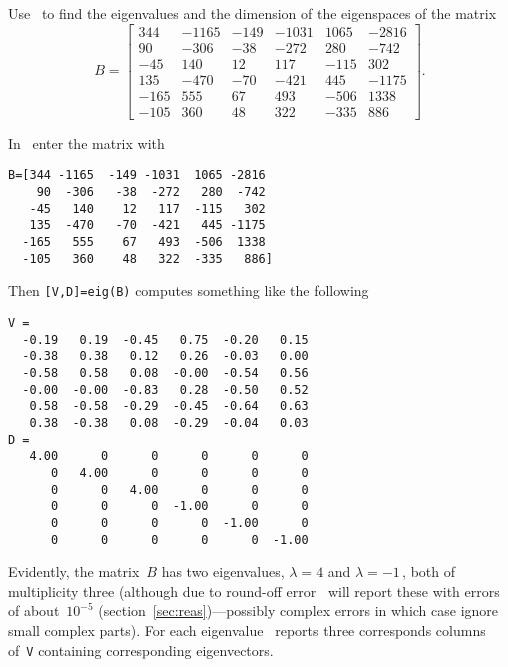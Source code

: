 \begin{example} \label{eg:}
Use \script\ to find the eigenvalues and the dimension of the eigenspaces of the matrix 
\begin{equation*}
B=\begin{bmatrix} 344&-1165&-149&-1031&1065&-2816
\\90&-306&-38&-272&280&-742
\\-45&140&12&117&-115&302
\\135&-470&-70&-421&445&-1175
\\-165&555&67&493&-506&1338
\\-105&360&48&322&-335&886 \end{bmatrix}.
\end{equation*}

\begin{solution} 
In \script\ enter the matrix with
\begin{verbatim}
B=[344 -1165  -149 -1031  1065 -2816
    90  -306   -38  -272   280  -742
   -45   140    12   117  -115   302
   135  -470   -70  -421   445 -1175
  -165   555    67   493  -506  1338
  -105   360    48   322  -335   886]
\end{verbatim}
\setbox\ajrqrbox\hbox{}%
\marginpar{\usebox{\ajrqrbox}}%
Then \verb|[V,D]=eig(B)| computes something like the following \twodp
\begin{verbatim}
V =
  -0.19   0.19  -0.45   0.75  -0.20   0.15
  -0.38   0.38   0.12   0.26  -0.03   0.00
  -0.58   0.58   0.08  -0.00  -0.54   0.56
  -0.00  -0.00  -0.83   0.28  -0.50   0.52
   0.58  -0.58  -0.29  -0.45  -0.64   0.63
   0.38  -0.38   0.08  -0.29  -0.04   0.03
D =
   4.00      0      0      0      0      0
      0   4.00      0      0      0      0
      0      0   4.00      0      0      0
      0      0      0  -1.00      0      0
      0      0      0      0  -1.00      0
      0      0      0      0      0  -1.00
\end{verbatim}
Evidently, the matrix~\(B\) has two eigenvalues, \(\lambda=4\) and \(\lambda=-1\)\,, both of multiplicity three (although due to round-off error \script\ will report these with errors of about~\(10^{-5}\) (section~\ref{sec:reas})---possibly complex errors in which case ignore small complex parts).
For each eigenvalue \script\ reports three corresponds columns of~\verb|V| containing corresponding eigenvectors.

\end{solution}
\end{example}
